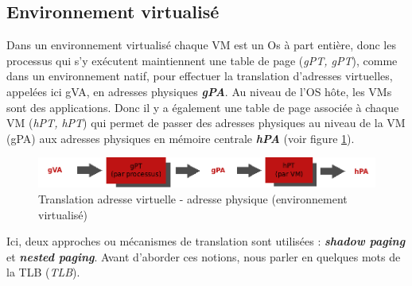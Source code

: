 \subsection{Environnement virtualisé}
Dans un environnement virtualisé chaque VM est un Os à part entière, donc les processus qui s'y exécutent maintiennent une table de page (\textit{\acl{gPT}, \acs{gPT}}), comme dans un environnement natif, pour effectuer la translation d'adresses virtuelles, appelées ici \ac{gVA}, en adresses physiques \textit{\textbf{\ac{gPA}}}. Au niveau de l'OS hôte, les VMs sont des applications. Donc il y a également une table de page associée à chaque VM (\textit{\acl{hPT}, \acs{hPT}}) qui permet de passer des adresses physiques au niveau de la VM (\acs{gPA}) aux adresses physiques en mémoire centrale \textit{\textbf{\ac{hPA}}} (voir figure \ref{fig:vaddr_paddr_virt}).
\begin{figure}[htp]
    \centering
    \includegraphics[scale=.5]{chapters/1/fig1/vaddr_paddr_virt}
    \caption{Translation adresse virtuelle - adresse physique (environnement virtualisé)}
    \label{fig:vaddr_paddr_virt}
\end{figure}

Ici, deux approches ou mécanismes de translation sont utilisées : \textit{\textbf{shadow paging}} et \textit{\textbf{nested paging}}. Avant d'aborder ces notions, nous parler en quelques mots de la TLB (\textit{\acl{TLB}}). 

